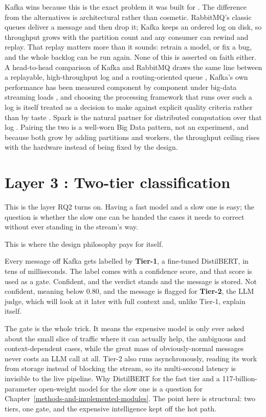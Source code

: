 Kafka wins because this is the exact problem it was built for \citep{kafka2011}. The difference from the alternatives is architectural rather than cosmetic. RabbitMQ's classic queues deliver a message and then drop it; Kafka keeps an ordered log on disk, so throughput grows with the partition count and any consumer can rewind and replay. That replay matters more than it sounds: retrain a model, or fix a bug, and the whole backlog can be run again. None of this is asserted on faith either. A head-to-head comparison of Kafka and RabbitMQ draws the same line between a replayable, high-throughput log and a routing-oriented queue \citep{dobbelaere2017kafka}, Kafka's own performance has been measured component by component under big-data streaming loads \citep{kafkaeval2017}, and choosing the processing framework that runs over such a log is itself treated as a decision to make against explicit quality criteria rather than by taste \citep{streamframeworks2019}. Spark is the natural partner for distributed computation over that log \citep{spark2016}. Pairing the two is a well-worn Big Data pattern, not an experiment, and because both grow by adding partitions and workers, the throughput ceiling rises with the hardware instead of being fixed by the design.

\section{Layer 3 : Two-tier classification}\label{layer-3-two-tier-classification}

This is the layer RQ2 turns on. Having a fast model and a slow one is easy; the question is whether the slow one can be handed the cases it needs to correct without ever standing in the stream's way.

This is where the design philosophy pays for itself.

Every message off Kafka gets labelled by \textbf{Tier-1}, a fine-tuned DistilBERT, in tens of milliseconds. The label comes with a confidence score, and that score is used as a gate. Confident, and the verdict stands and the message is stored. Not confident, meaning below 0.80, and the message is flagged for \textbf{Tier-2}, the LLM judge, which will look at it later with full context and, unlike Tier-1, explain itself.

The gate is the whole trick. It means the expensive model is only ever asked about the small slice of traffic where it can actually help, the ambiguous and context-dependent cases, while the great mass of obviously-normal messages never costs an LLM call at all. Tier-2 also runs asynchronously, reading its work from storage instead of blocking the stream, so its multi-second latency is invisible to the live pipeline. Why DistilBERT for the fast tier and a 117-billion-parameter open-weight model for the slow one is a question for Chapter~\ref{methods-and-implemented-modules}. The point here is structural: two tiers, one gate, and the expensive intelligence kept off the hot path.

